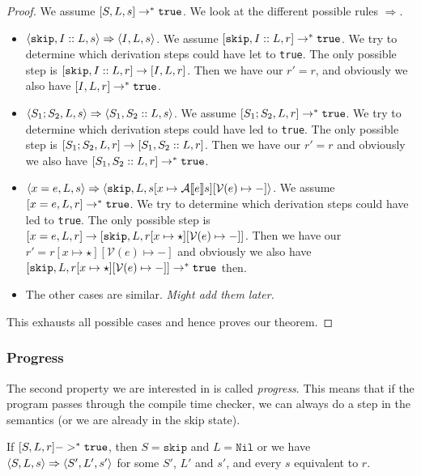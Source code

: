 \begin{proof}
We assume $[ S, L, s ] \to ^* \texttt{true}$. We look at the different possible rules $\Rightarrow$. 
\begin{itemize}
    \item $\langle \texttt{skip}, I::L, s \rangle \Rightarrow \langle I, L, s \rangle$. We assume $[ \texttt{skip}, I::L, r ] \to ^* \texttt{true}$. We try to determine which derivation steps could have let to \texttt{true}. The only possible step is $[ \texttt{skip}, I::L, r ]\to [ I, L, r ]$. Then we have our $r' = r$, and obviously we also have $[ I, L, r ] \to^* \texttt{true}$.
    \item $\langle S_1; S_2, L, s \rangle \Rightarrow \langle S_1, S_2::L, s \rangle$. We assume $[ S_1; S_2, L, r ] \to ^* \texttt{true}$. We try to determine which derivation steps could have led to \texttt{true}. The only possible step is $[ S_1; S_2, L, r ] \to [ S_1, S_2::L, r ]$. Then we have our $r' = r$ and obviously we also have $[ S_1, S_2::L, r ] \to^* \texttt{true}$.
    \item $\langle x = e, L, s \rangle \Rightarrow \langle \texttt{skip}, L, s[x \mapsto \mathcal{A} \llbracket e \rrbracket s][\mathcal{V}(e)\mapsto-] \rangle$. We assume $[ x = e, L, r ] \to ^* \texttt{true}$. We try to determine which derivation steps could have led to \texttt{true}. The only possible step is $[ x=e, L, r ] \to [ \texttt{skip}, L, r[x\mapsto \star][\mathcal{V}(e) \mapsto -] ]$. Then we have our $r' = r[x\mapsto \star][\mathcal{V}(e) \mapsto -]$ and obviously we also have $[ \texttt{skip}, L, r[x\mapsto \star][\mathcal{V}(e) \mapsto -] ] \to^* \texttt{true}$ then.
    \item The other cases are similar. \emph{Might add them later.}
\end{itemize}
This exhausts all possible cases and hence proves our theorem.
\end{proof}

\subsubsection{Progress}
The second property we are interested in is called \emph{progress}. This means that if the program passes through the compile time checker, we can always do a step in the semantics (or we are already in the skip state). 

\begin{theorem}
\label{progress}
If $[ S, L, r ] ->^* \texttt{true}$, then $S = \texttt{skip}$ and $L = \texttt{Nil}$ or we have $\langle S, L, s \rangle \Rightarrow \langle S', L', s' \rangle$ for some $S'$, $L'$ and $s'$, and every $s$ equivalent to $r$.
\end{theorem}

